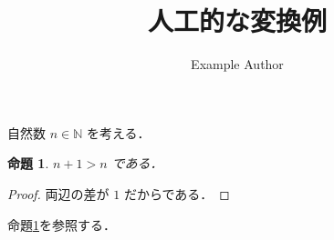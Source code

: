 \documentclass{article}
\title{人工的な変換例}
\author{Example Author}
\newtheorem{prop}{命題}
\begin{document}
自然数 $n\in\mathbb{N}$ を考える．
\begin{prop}\label{sample}
$n+1>n$ である．
\end{prop}
\begin{proof}
両辺の差が $1$ だからである．
\end{proof}
命題\ref{sample}を参照する．
\end{document}
